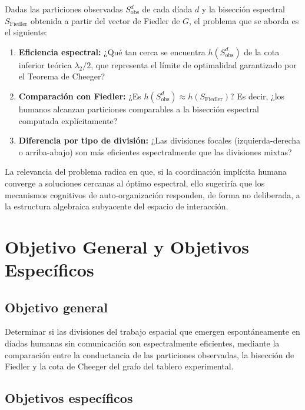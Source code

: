 \documentclass[journal]{IEEEtran}
\begin{document}
Dadas las particiones observadas $S_{\text{obs}}^d$ de cada díada $d$ y la bisección
espectral $S_{\text{Fiedler}}$ obtenida a partir del vector de Fiedler de $G$, el
problema que se aborda es el siguiente:

\begin{enumerate}
  \item \textbf{Eficiencia espectral:} ¿Qué tan cerca se encuentra $h(S_{\text{obs}}^d)$
        de la cota inferior teórica $\lambda_2/2$, que representa el límite de optimalidad
        garantizado por el Teorema de Cheeger?

  \item \textbf{Comparación con Fiedler:} ¿Es $h(S_{\text{obs}}^d)\approx
        h(S_{\text{Fiedler}})$? Es decir, ¿los humanos alcanzan particiones
        comparables a la bisección espectral computada explícitamente?

  \item \textbf{Diferencia por tipo de división:} ¿Las divisiones focales
        (izquierda-derecha o arriba-abajo) son más eficientes espectralmente que las
        divisiones mixtas?
\end{enumerate}

La relevancia del problema radica en que, si la coordinación implícita humana converge
a soluciones cercanas al óptimo espectral, ello sugeriría que los mecanismos cognitivos
de auto-organización responden, de forma no deliberada, a la estructura algebraica
subyacente del espacio de interacción.


\section{Objetivo General y Objetivos Específicos}

\subsection{Objetivo general}

Determinar si las divisiones del trabajo espacial que emergen espontáneamente en díadas
humanas sin comunicación son espectralmente eficientes, mediante la comparación entre la
conductancia de las particiones observadas, la bisección de Fiedler y la cota de Cheeger
del grafo del tablero experimental.

\subsection{Objetivos específicos}
\end{document}

